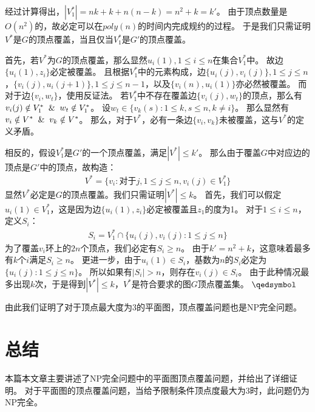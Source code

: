 \documentclass[UTF8]{ctexart}
\begin{document}
经过计算得出，$|V_1^*|=nk+k+n(n-k)=n^2+k=k'$。
由于顶点数量是$O(n^2)$的，故必定可以在$poly(n)$的时间内完成规约的过程。
于是我们只需证明$V^*$是$G$的顶点覆盖，当且仅当$V_1^*$是$G'$的顶点覆盖。 \par
首先，若$V^*$为$G$的顶点覆盖，那么显然$u_i(1),1 \leq i \leq n$在集合$V_1^*$中。
故边$\{u_i(1),z_i\}$必定被覆盖。
且根据$V_1^*$中的元素构成，边$\{u_i(j),v_i(j)\}, 1 \leq j \leq n$，$\{v_i(j),u_i(j+1)\}, 1 \leq j \leq n-1$，以及$\{v_i(n),u_i(1)\}$亦必然被覆盖。
而对于边$\{v_i,w_t\}$，使用反证法。
若$V_1^*$中不存在覆盖边$\{v_i(j),w_t\}$的顶点，那么有$v_i(j) \notin V_1^* \And w_t \notin V_1^*$。
设$w_t \in \{v_k(s): 1 \leq k,s \leq n, k \neq i\}$。
那么显然有$v_i \notin V^* \And v_k \notin V^*$。
那么，对于$V^*$，必有一条边$\{v_i,v_k\}$未被覆盖，这与$V^*$的定义矛盾。 \par

相反的，假设$V_1^*$是$G'$的一个顶点覆盖，满足$|V^*| \leq k'$。
那么由于覆盖$G$中对应边的顶点是$G'$中的顶点，故构造：
\begin{gather*}
    V^* = \{v_i: \mbox{对于}j,1 \leq j \leq n,v_i(j) \in V^*_1\}
\end{gather*}
显然$V^*$必定是$G$的顶点覆盖。我们只需证明$|V^*| \leq k$。
首先，我们可以假定$u_i(1) \in V_1^*$，这是因为边$\{u_i(1),z_i\}$必定被覆盖且$z_1$的度为1。
对于$1 \leq i \leq n$，定义$S_i$：
\begin{gather*}
    S_i = V_1^* \cap \{u_i(j),v_i(j):1 \leq j \leq n\}
\end{gather*}
为了覆盖$v_i$环上的$2n$个顶点，我们必定有$S_i \geq n$。
由于$k' = n^2+k$，这意味着最多有$k$个$i$满足$S_i \geq n$。
更进一步，由于$u_i(1) \in S_i$，基数为$n$的$S_i$必定为$\{u_i(j): 1 \leq j \leq n\}$。
所以如果有$|S_i| > n$，则存在$v_i(j) \in S_i$。
由于此种情况最多出现$k$次，于是得到$|V^*| \leq k$，$V^*$是符合要求的图$G$顶点覆盖集。 $\qedsymbol$ \par
由此我们证明了对于顶点最大度为3的平面图，顶点覆盖问题也是NP完全问题。

\section{总结}
本篇本文章主要讲述了NP完全问题中的平面图顶点覆盖问题，并给出了详细证明。
对于平面图的顶点覆盖问题，当给予限制条件顶点度最大为3时，此问题仍为NP完全。
\end{document}
